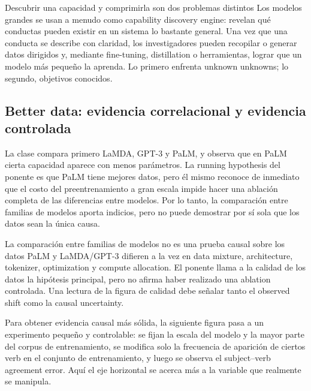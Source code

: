 \begin{importantbox}{Descubrir una capacidad y comprimirla son dos problemas distintos}
Los modelos grandes se usan a menudo como capability discovery engine: revelan qué conductas pueden existir en un sistema lo bastante general. Una vez que una conducta se describe con claridad, los investigadores pueden recopilar o generar datos dirigidos y, mediante fine-tuning, distillation o herramientas, lograr que un modelo más pequeño la aprenda. Lo primero enfrenta unknown unknowns; lo segundo, objetivos conocidos.
\end{importantbox}

\subsection{Better data: evidencia correlacional y evidencia controlada}

La clase compara primero LaMDA, GPT-3 y PaLM, y observa que en PaLM cierta capacidad aparece con menos parámetros. La running hypothesis del ponente es que PaLM tiene mejores datos, pero él mismo reconoce de inmediato que el costo del preentrenamiento a gran escala impide hacer una ablación completa de las diferencias entre modelos. Por lo tanto, la comparación entre familias de modelos aporta indicios, pero no puede demostrar por sí sola que los datos sean la única causa.


\begin{warningbox}{La comparación entre familias de modelos no es una prueba causal sobre los datos}
PaLM y LaMDA/GPT-3 difieren a la vez en data mixture, architecture, tokenizer, optimization y compute allocation. El ponente llama a la calidad de los datos la hipótesis principal, pero no afirma haber realizado una ablation controlada. Una lectura de la figura de calidad debe señalar tanto el observed shift como la causal uncertainty.
\end{warningbox}

Para obtener evidencia causal más sólida, la siguiente figura pasa a un experimento pequeño y controlable: se fijan la escala del modelo y la mayor parte del corpus de entrenamiento, se modifica solo la frecuencia de aparición de ciertos verb en el conjunto de entrenamiento, y luego se observa el subject--verb agreement error. Aquí el eje horizontal se acerca más a la variable que realmente se manipula.

